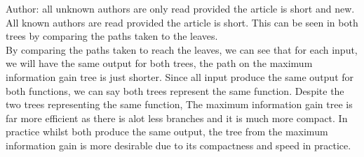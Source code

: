 \documentclass{article}
\begin{document}
\begin{enumerate}[(a)]
Author: all unknown authors are only read provided the article is short and new. All known authors are read provided the article is short. This can be seen in both trees by comparing the paths taken to the leaves.\\

By comparing the paths taken to reach the leaves, we can see that for each input, we will have the same output for both trees, the path on the maximum information gain tree is just shorter. Since all input produce the same output for both functions, we can say both trees represent the same function. Despite the two trees representing the same function, The maximum information gain tree is far more efficient as there is alot less branches and it is much more compact. In practice whilst both produce the same output, the tree from the maximum information gain is more desirable due to its compactness and speed in practice. \\


\end{enumerate}
\end{document}
